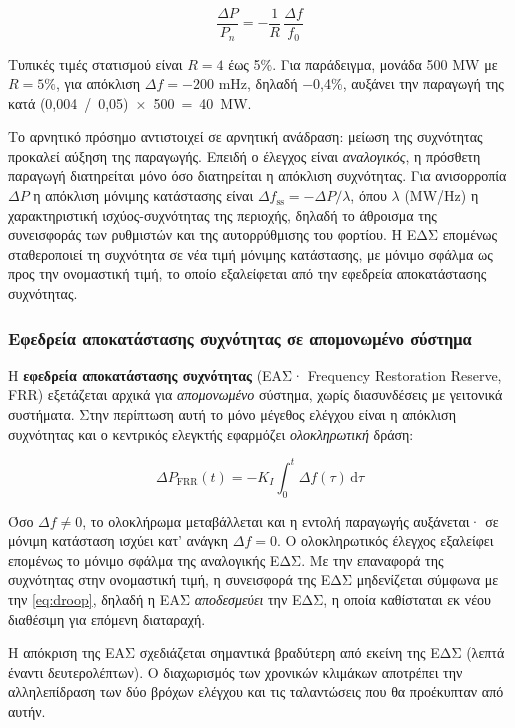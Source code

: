 \begin{equation}
\frac{\Delta P}{P_n} = -\frac{1}{R}\,\frac{\Delta f}{f_0}
\label{eq:droop}
\end{equation}

Τυπικές τιμές στατισμού είναι $R = 4$ έως 5\%. Για παράδειγμα, μονάδα 500 MW με $R = 5\%$,
για απόκλιση $\Delta f = -200$ mHz, δηλαδή −0,4\%, αυξάνει την παραγωγή της κατά
(0,004~/~0,05)~×~500~=~40~MW.

Το αρνητικό πρόσημο αντιστοιχεί σε αρνητική ανάδραση: μείωση της συχνότητας προκαλεί αύξηση
της παραγωγής. Επειδή ο έλεγχος είναι \emph{αναλογικός}, η πρόσθετη παραγωγή διατηρείται μόνο
όσο διατηρείται η απόκλιση συχνότητας. Για ανισορροπία $\Delta P$ η απόκλιση μόνιμης
κατάστασης είναι $\Delta f_{\mathrm{ss}} = -\Delta P / \lambda$, όπου $\lambda$ (MW/Hz) η
χαρακτηριστική ισχύος-συχνότητας της περιοχής, δηλαδή το άθροισμα της συνεισφοράς των
ρυθμιστών και της αυτορρύθμισης του φορτίου. Η ΕΔΣ επομένως σταθεροποιεί τη συχνότητα σε
νέα τιμή μόνιμης κατάστασης, με μόνιμο σφάλμα ως προς την ονομαστική τιμή, το οποίο
εξαλείφεται από την εφεδρεία αποκατάστασης συχνότητας.

\subsubsection*{Εφεδρεία αποκατάστασης συχνότητας σε απομονωμένο σύστημα}

Η \textbf{εφεδρεία αποκατάστασης συχνότητας} (ΕΑΣ· Frequency Restoration Reserve, FRR)
εξετάζεται αρχικά για \emph{απομονωμένο} σύστημα, χωρίς διασυνδέσεις με γειτονικά
συστήματα. Στην περίπτωση αυτή το μόνο μέγεθος ελέγχου είναι η απόκλιση συχνότητας και ο
κεντρικός ελεγκτής εφαρμόζει \emph{ολοκληρωτική} δράση:

\begin{equation}
\Delta P_{\mathrm{FRR}}(t) = -K_I \int_0^{t} \Delta f(\tau)\,\mathrm{d}\tau
\label{eq:frr-isolated}
\end{equation}

Όσο $\Delta f \neq 0$, το ολοκλήρωμα μεταβάλλεται και η εντολή παραγωγής αυξάνεται· σε μόνιμη
κατάσταση ισχύει κατ' ανάγκη $\Delta f = 0$. Ο ολοκληρωτικός έλεγχος εξαλείφει επομένως το
μόνιμο σφάλμα της αναλογικής ΕΔΣ. Με την επαναφορά της συχνότητας στην ονομαστική τιμή, η
συνεισφορά της ΕΔΣ μηδενίζεται σύμφωνα με την \eqref{eq:droop}, δηλαδή η ΕΑΣ
\emph{αποδεσμεύει} την ΕΔΣ, η οποία καθίσταται εκ νέου διαθέσιμη για επόμενη διαταραχή.

Η απόκριση της ΕΑΣ σχεδιάζεται σημαντικά βραδύτερη από εκείνη της ΕΔΣ (λεπτά έναντι
δευτερολέπτων). Ο διαχωρισμός των χρονικών κλιμάκων αποτρέπει την αλληλεπίδραση των δύο
βρόχων ελέγχου και τις ταλαντώσεις που θα προέκυπταν από αυτήν.

